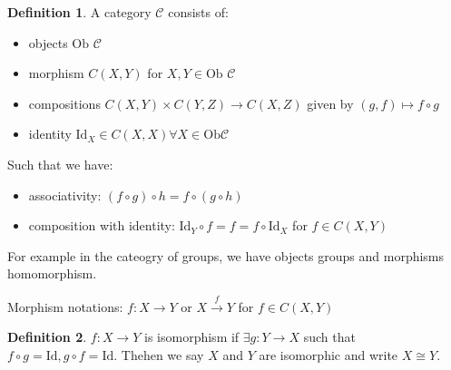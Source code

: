 \documentclass{article}
\theoremstyle{definition}
\newtheorem*{definition}{Definition}
\begin{document}
\begin{definition}
    A category \(\mathcal{C}\) consists of:

    \begin{itemize}
        \item objects \(\text{Ob } \mathcal{C}\) 

        \item morphism \(C(X,Y)\) for \(X, Y \in \text{Ob } \mathcal{C}\)
    
        \item compositions \(C(X,Y) \times C(Y,Z) \to C(X,Z)\) given by \((g,f) \mapsto f \circ g\) 

        \item identity \(\text{Id}_X \in C(X,X) \forall X\in \text{Ob} \mathcal{C}\) 

    \end{itemize}
    
    Such that we have:

    \begin{itemize}
  
    \item associativity: \((f \circ g)\circ h = f\circ (g\circ h)\) 

    \item composition with identity: \(\text{Id}_Y \circ f = f = f\circ \text{Id}_X\) for \(f\in C(X,Y)\)

    \end{itemize}

    For example in the cateogry of groups, we have objects groups and morphisms homomorphism. 

    Morphism notations: \(f: X \to Y\) or \(X \overset{f}{\to } Y\) for \(f\in C(X,Y)\) 

\end{definition}

\begin{definition}
    \(f: X \to Y\) is isomorphism if \(\exists g:Y \to X\) such that \(f\circ g = \text{Id}, g\circ f = \text{Id}\). Thehen we say \(X\) and \(Y\) are isomorphic and write \(X \cong Y\).
\end{definition}
\end{document}
